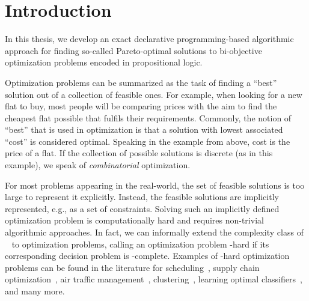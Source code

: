 \chapter{Introduction\label{chap:intro}}

In this thesis, we develop an exact declarative programming-based algorithmic approach for finding so-called Pareto-optimal solutions to bi-objective optimization problems encoded in propositional logic.

Optimization problems can be summarized as the task of finding a ``best'' solution out of a collection of feasible ones.
For example, when looking for a new flat to buy, most people will be comparing prices with the aim to find the cheapest flat possible that fulfils their requirements.
Commonly, the notion of ``best'' that is used in optimization is that a solution with lowest associated ``cost'' is considered optimal.
Speaking in the example from above, cost is the price of a flat.
If the collection of possible solutions is discrete (as in this example), we speak of \emph{combinatorial} optimization.

For most problems appearing in the real-world, the set of feasible solutions is too large to represent it explicitly.
Instead, the feasible solutions are implicitly represented, e.g., as a set of constraints.
Solving such an implicitly defined optimization problem is computationally hard and requires non-trivial algorithmic approaches.
In fact, we can informally extend the complexity class of \NP{}~\autocite{AroraBarak2009-complexity} to optimization problems, calling an optimization problem \NP-hard if its corresponding decision problem is \NP-complete.
Examples of \NP-hard optimization problems can be found in the literature for scheduling~\autocites{DBLP:conf/cp/Stojadinovic14,DBLP:conf/cpaior/BofillGSV15,DBLP:journals/ior/Solomon87,DBLP:journals/candie/AkyolB07}, supply chain optimization~\autocite{DBLP:journals/cce/Papageorgiou09}, air traffic management~\autocites{DBLP:journals/ior/BertsimasLO11,RichardsHow2002Aircrafttrajectoryplanning}, clustering~\autocite{DBLP:journals/ai/DaoDV17,DBLP:conf/sdm/DavidsonRS10}, learning optimal classifiers~\autocites{DBLP:conf/cp/MaliotovM18,DBLP:conf/ijcai/NarodytskaIPM18,DBLP:conf/ijcai/Hu0HH20,DBLP:conf/cp/YuISB20,DBLP:conf/aaai/DemirovicS21,DBLP:conf/cp/ShatiCM21,DBLP:conf/cade/IgnatievPNM18}, and many more.

